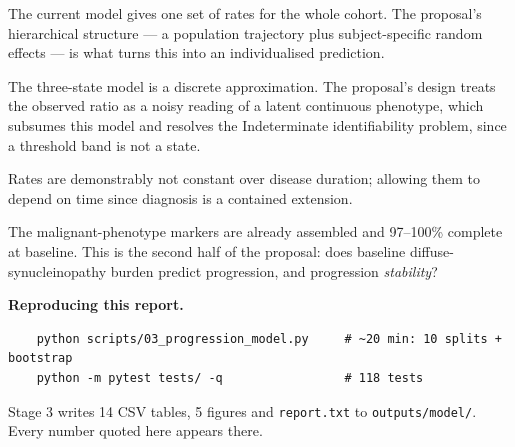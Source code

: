 \documentclass[11pt,a4paper]{article}
\newcommand{\code}[1]{\texttt{\small #1}}
\begin{document}
\begin{description}[leftmargin=1.5cm,style=nextline]
  \item[Patient-specific progression] The current model gives one set of rates
    for the whole cohort. The proposal's hierarchical structure --- a
    population trajectory plus subject-specific random effects --- is what
    turns this into an individualised prediction.
  \item[Move to the continuous ratio] The three-state model is a discrete
    approximation. The proposal's design treats the observed ratio as a noisy
    reading of a latent continuous phenotype, which subsumes this model and
    resolves the Indeterminate identifiability problem, since a threshold band
    is not a state.
  \item[Relax time-homogeneity] Rates are demonstrably not constant over
    disease duration; allowing them to depend on time since diagnosis is a
    contained extension.
  \item[Add baseline covariates] The malignant-phenotype markers are already
    assembled and 97--100\% complete at baseline. This is the second half of
    the proposal: does baseline diffuse-synucleinopathy burden predict
    progression, and progression \emph{stability}?
\end{description}

\vspace{1em}
\noindent\textbf{Reproducing this report.}
\begin{verbatim}
    python scripts/03_progression_model.py     # ~20 min: 10 splits + bootstrap
    python -m pytest tests/ -q                 # 118 tests
\end{verbatim}
\noindent
Stage 3 writes 14 CSV tables, 5 figures and \code{report.txt} to
\code{outputs/model/}. Every number quoted here appears there.
\end{document}
